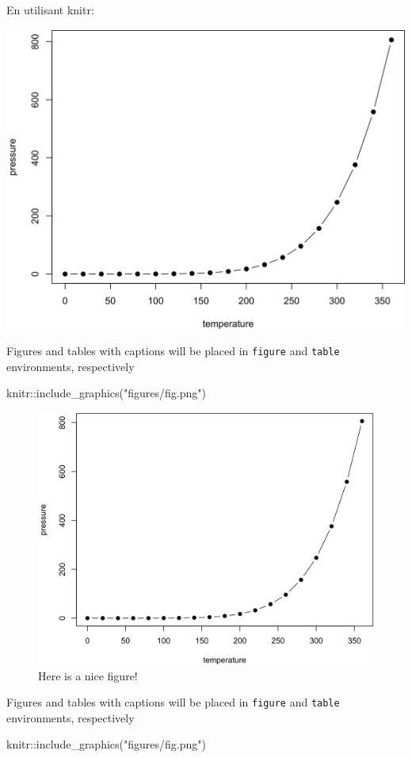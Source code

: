 \documentclass[
]{book}
\newenvironment{Shaded}{\begin{snugshade}}{\end{snugshade}}
\newcommand{\FunctionTok}[1]{\textcolor[rgb]{0.00,0.00,0.00}{#1}}
\newcommand{\NormalTok}[1]{#1}
\newcommand{\SpecialCharTok}[1]{\textcolor[rgb]{0.00,0.00,0.00}{#1}}
\newcommand{\StringTok}[1]{\textcolor[rgb]{0.31,0.60,0.02}{#1}}
\begin{document}
En utilisant knitr:

\includegraphics[width=0.5\linewidth]{figures/fig}

Figures and tables with captions will be placed in \texttt{figure} and \texttt{table} environments, respectively

\begin{Shaded}
\begin{Highlighting}[]
\NormalTok{knitr}\SpecialCharTok{::}\FunctionTok{include\_graphics}\NormalTok{(}\StringTok{"figures/fig.png"}\NormalTok{)}
\end{Highlighting}
\end{Shaded}

\begin{figure}

{\centering \includegraphics[width=0.6\linewidth]{figures/fig} 

}

\caption{Here is a nice figure!}\label{fig:nice-fig}
\end{figure}

\newpage

Figures and tables with captions will be placed in \texttt{figure} and \texttt{table} environments, respectively

\begin{Shaded}
\begin{Highlighting}[]
\NormalTok{knitr}\SpecialCharTok{::}\FunctionTok{include\_graphics}\NormalTok{(}\StringTok{"figures/fig.png"}\NormalTok{)}
\end{Highlighting}
\end{Shaded}
\end{document}
